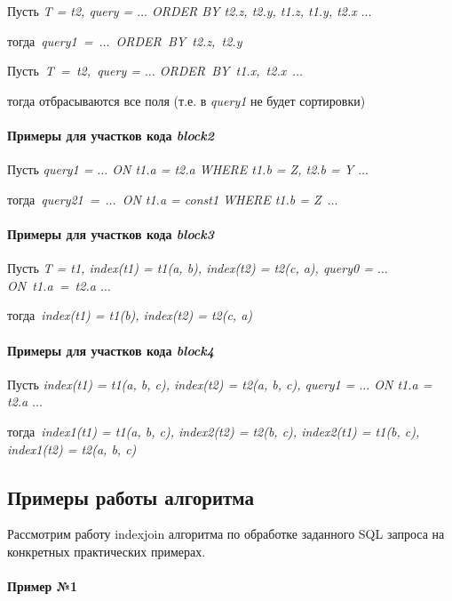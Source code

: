 Пусть \textit{T = t2, query = $\ldots$ ORDER BY t2.z, t2.y, t1.z, t1.y, t2.x $\ldots$}

тогда \textit{query1 = $\ldots$ ORDER BY t2.z, t2.y}

Пусть \textit{T = t2, query = $\ldots$ ORDER BY t1.x, t2.x $\ldots$}

тогда отбрасываются все поля (т.е. в \textit{query1} не будет сортировки)

\paragraph{Примеры для участков кода \textit{block2}}

Пусть \textit{query1 = $\ldots$ ON t1.a = t2.a WHERE t1.b = Z, t2.b = Y $\ldots$}

тогда \textit{query21 = $\ldots$ ON t1.a = const1 WHERE t1.b = Z $\ldots$}

\paragraph{Примеры для участков кода \textit{block3}}

Пусть \textit{T = t1, index(t1) = t1(a, b), index(t2) = t2(c, a), query0 = $\ldots$ ON t1.a = t2.a $\ldots$}

тогда \textit{index(t1) = t1(b), index(t2) = t2(c, a)}

\paragraph{Примеры для участков кода \textit{block4}}

Пусть \textit{index(t1) = t1(a, b, c), index(t2) = t2(a, b, c), query1 = $\ldots$ ON t1.a = t2.a $\ldots$} 

тогда \textit{index1(t1) = t1(a, b, c), index2(t2) = t2(b, c), index2(t1) = t1(b, c), index1(t2) = t2(a, b, c)}

\subsection{Примеры работы алгоритма}

Рассмотрим работу indexjoin алгоритма по обработке заданного SQL запроса на конкретных практических примерах.

\paragraph{Пример №1}

